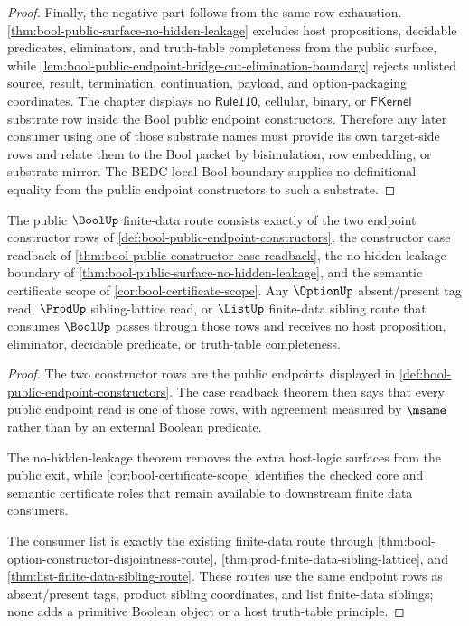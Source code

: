 \begin{proof}
Finally, the negative part follows from the same row exhaustion. \autoref{thm:bool-public-surface-no-hidden-leakage} excludes host propositions, decidable predicates, eliminators, and truth-table completeness from the public surface, while \autoref{lem:bool-public-endpoint-bridge-cut-elimination-boundary} rejects unlisted source, result, termination, continuation, payload, and option-packaging coordinates. The chapter displays no $\mathsf{Rule110}$, cellular, binary, or $\mathsf{FKernel}$ substrate row inside the Bool public endpoint constructors. Therefore any later consumer using one of those substrate names must provide its own target-side rows and relate them to the Bool packet by bisimulation, row embedding, or substrate mirror. The BEDC-local Bool boundary supplies no definitional equality from the public endpoint constructors to such a substrate.
\end{proof}

\begin{theorem}
\label{thm:bool-finite-data-exit-route}
The public $\BoolUp$ finite-data route consists exactly of the two endpoint
constructor rows of \autoref{def:bool-public-endpoint-constructors}, the
constructor case readback of
\autoref{thm:bool-public-constructor-case-readback}, the no-hidden-leakage
boundary of \autoref{thm:bool-public-surface-no-hidden-leakage}, and the
semantic certificate scope of \autoref{cor:bool-certificate-scope}. Any
$\OptionUp$ absent/present tag read, $\ProdUp$ sibling-lattice read, or
$\ListUp$ finite-data sibling route that consumes $\BoolUp$ passes through
those rows and receives no host proposition, eliminator, decidable predicate,
or truth-table completeness.
\end{theorem}
\begin{proof}
The two constructor rows are the public endpoints displayed in
\autoref{def:bool-public-endpoint-constructors}. The case readback theorem
then says that every public endpoint read is one of those rows, with agreement
measured by $\msame$ rather than by an external Boolean predicate.

The no-hidden-leakage theorem removes the extra host-logic surfaces from the
public exit, while \autoref{cor:bool-certificate-scope} identifies the checked
core and semantic certificate roles that remain available to downstream finite
data consumers.

The consumer list is exactly the existing finite-data route through
\autoref{thm:bool-option-constructor-disjointness-route},
\autoref{thm:prod-finite-data-sibling-lattice}, and
\autoref{thm:list-finite-data-sibling-route}. These routes use the same
endpoint rows as absent/present tags, product sibling coordinates, and list
finite-data siblings; none adds a primitive Boolean object or a host
truth-table principle.
\end{proof}

